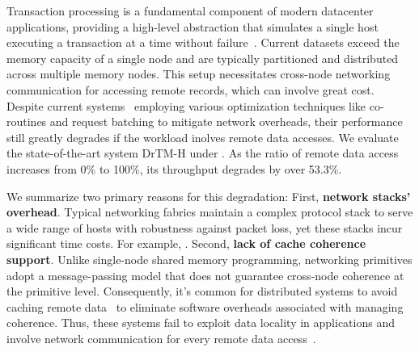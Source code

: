 Transaction processing is a fundamental component of modern datacenter applications, providing a high-level abstraction that simulates a single host executing a transaction at a time without failure~\cite{farm_nsdi14, compromise}. Current datasets exceed the memory capacity of a single node and are typically partitioned and distributed across multiple memory nodes. This setup necessitates cross-node networking communication for accessing remote records, which can involve great cost. Despite current systems~\cite{farm_nsdi14, myth_vldb17, xenic_sosp21, ipipe_sigcomm19, linefs_sosp21, grappa_atc15, guideline_atc16, fasst} employing various optimization techniques like co-routines and request batching to mitigate network overheads, their performance still greatly degrades if the workload inolves remote data accesses. We evaluate the state-of-the-art system DrTM-H under . As the ratio of remote data access increases from 0\% to 100\%, its throughput degrades by over 53.3\%. 

We summarize two primary reasons for this degradation: First,\textbf{ network stacks' overhead}. Typical networking fabrics maintain a complex protocol stack to serve a wide range of hosts with robustness against packet loss, yet these stacks incur significant time costs. For example, . Second, \textbf{lack of cache coherence support}. Unlike single-node shared memory programming, networking primitives adopt a message-passing model that does not guarantee cross-node coherence at the primitive level. Consequently, it's common for distributed systems to avoid caching remote data~\cite{ddio_ispass20, ddio-doc, farm_nsdi14, myth_vldb17, xenic_sosp21, ipipe_sigcomm19, linefs_sosp21} to eliminate software overheads associated with managing coherence. Thus, these systems fail to exploit data locality in applications and involve network communication for every remote data access~\cite{fasst, learned_cache}.






